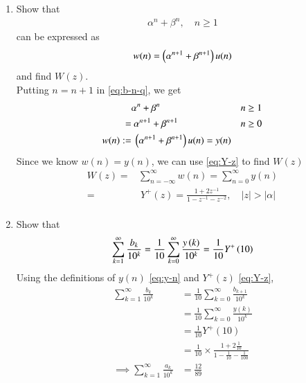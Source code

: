 \documentclass[journal,12pt,twocolumn]{IEEEtran}
\renewcommand\thesection{\arabic{section}}
\begin{document}
\begin{enumerate}[label=\thesection.\arabic*,ref=\thesection.\theenumi]
\item Show that
	\begin{align}
		\alpha^n + \beta^n, \quad n \ge 1
		\label{eq:b-n-q}
	\end{align}
	can be expressed as 
	\begin{align}
		w(n) =\left(\alpha^{n+1} + \beta^{n+1}\right)u(n)
	\end{align}
	and find $W(z)$. \\
	\solution Putting $n = n+1$ in \eqref{eq:b-n-q}, we get
	\begin{align*}
		& \alpha^{n} + \beta^{n} & n \ge 1\\
		=& \ \alpha^{n+1} + \beta^{n+1} & n \ge 0 \\
		w(n) :=& \ \left(\alpha^{n+1} + \beta^{n+1}\right) u(n) = y(n)
	\end{align*}
	Since we know $w(n) = y(n)$, we can use \eqref{eq:Y-z} to find $W(z)$
	\begin{align*}
		W(z) =& \sum_{n=-\infty}^\infty w(n) = \sum_{n=0}^\infty y(n)\\
		=& \ Y^+(z) = \frac{1 + 2z^{-1}}{1 - z^{-1} - z^{-2}}, \quad |z| > |\alpha| \\
	\end{align*}


\item Show that
	\begin{align}
		\sum_{k=1}^{\infty}\frac{b_k}{10^k} =
		\frac{1}{10}\sum_{k=0}^{\infty}\frac{y\left(k\right)}{10^k} =\frac{1}{10}Y^{+}\left({10}\right)
	\end{align}
	\solution Using the definitions of  $y(n)$ \eqref{eq:y-n} and $Y^+(z)$ \eqref{eq:Y-z},
	\begin{align}
		\sum_{k=1}^{\infty}\frac{b_k}{10^k}
		&= \frac{1}{10}\sum_{k = 0}^{\infty}\frac{b_{k+1}}{10^k} \nonumber \\
		&= \frac{1}{10}\sum_{k = 0}^{\infty}\frac{y(k)}{10^k} \nonumber \\
		&= \frac{1}{10}Y^+(10) \nonumber \\
		&= \frac{1}{10} \times \frac{1 + 2\frac{1}{10}}{1 - \frac{1}{10} - \frac{1}{100}} \nonumber \\
		\implies \sum_{k=1}^{\infty}\frac{a_k}{10^k} &= \frac{12}{89} \label{op:4} \\ \nonumber
	\end{align}



\end{enumerate}
\end{document}
